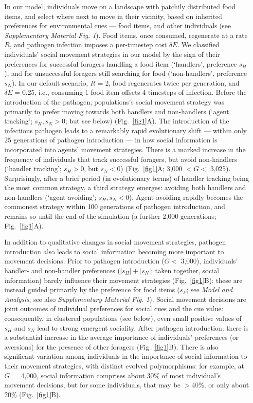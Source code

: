 In our model, individuals move on a landscape with patchily distributed food items, and select where next to move in their vicinity, based on inherited preferences for environmental cues --- food items, and other individuals (see \textit{Supplementary Material Fig. 1}).
Food items, once consumed, regenerate at a rate $R$, and pathogen infection imposes a per-timestep cost $\delta E$.
We classified individuals' social movement strategies in our model by the sign of their preferences for successful foragers handling a food item (`handlers', preference $s_H$), and for unsuccessful foragers still searching for food (`non-handlers', preference $s_N$).
In our default scenario, $R$ = 2, food regenerates twice per generation, and $\delta E$ = 0.25, i.e., consuming 1 food item offsets 4 timesteps of infection. 
Before the introduction of the pathogen, populations's social movement strategy was primarily to prefer moving towards both handlers and non-handlers (`agent tracking'; $s_H, s_N > 0$; but see below) (Fig.~\ref{fig1}A).
The introduction of the infectious pathogen leads to a remarkably rapid evolutionary shift --- within only 25 generations of pathogen introduction --- in how social information is incorporated into agents' movement strategies.
There is a marked increase in the frequency of individuals that track successful foragers, but avoid non-handlers (`handler tracking'; $s_H > 0$, but $s_N < 0$) (Fig.~\ref{fig1}A; 3,000 $< G <$ 3,025).
Surprisingly, after a brief period (in evolutionary terms) of handler tracking being the most common strategy, a third strategy emerges: avoiding both handlers and non-handlers (`agent avoiding'; $s_H, s_N < 0$).
Agent avoiding rapidly becomes the commonest strategy within 100 generations of pathogen introduction, and remains so until the end of the simulation (a further 2,000 generations; Fig.~\ref{fig1}A).

In addition to qualitative changes in social movement strategies, pathogen introduction also leads to social information becoming more important to movement decisions.
Prior to pathogen introduction ($G <$ 3,000), individuals' handler- and non-handler preferences ($|s_H| + |s_N|$; taken together, social information) barely influence their movement strategies (Fig.~\ref{fig1}B); these are instead guided primarily by the preference for food items ($s_F$; see \textit{Model and Analysis}; see also \textit{Supplementary Material Fig. 1}).
Social movement decisions are joint outcomes of individual preferences for social cues and the cue value: consequently, in clustered populations (see below), even small positive values of $s_H$ and $s_N$ lead to strong emergent sociality.
After pathogen introduction, there is a substantial increase in the average importance of individuals' preferences (or aversions) for the presence of other foragers (Fig.~\ref{fig1}B).
There is also significant variation among individuals in the importance of social information to their movement strategies, with distinct evolved polymorphisms: for example, at $G =$ 4,000, social information comprises about 30\% of most individual's movement decisions, but for some individuals, that may be $>$40\%, or only about 20\% (Fig.~\ref{fig1}B).

